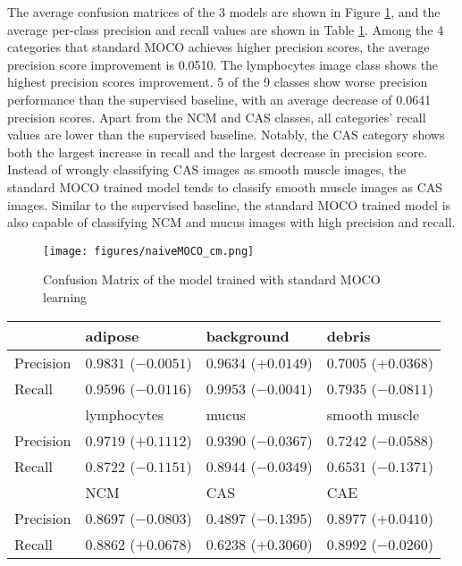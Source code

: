 \documentclass[12pt,twoside]{report}
\begin{document}
The average confusion matrices of the 3 models are shown in Figure \ref{fig:naiveMOCO_cm}, and the average per-class precision and recall values are shown in Table \ref{tab:naiveMOCO_preci_recall}. Among the 4 categories that standard MOCO achieves higher precision scores, the average precision score improvement is 0.0510. The lymphocytes image class shows the highest precision scores improvement. 5 of the 9 classes show worse precision performance than the supervised baseline, with an average decrease of 0.0641 precision scores. Apart from the NCM and CAS classes, all categories' recall values are lower than the supervised baseline. Notably, the CAS category shows both the largest increase in recall and the largest decrease in precision score. Instead of wrongly classifying CAS images as smooth muscle images, the standard MOCO trained model tends to classify smooth muscle images as CAS images. Similar to the supervised baseline, the standard MOCO trained model is also capable of classifying NCM and mucus images with high precision and recall. \\ 

\begin{figure}
    \centering
    \texttt{[image: figures/naiveMOCO\_cm.png]}
    \caption{Confusion Matrix of the model trained with standard MOCO learning}
    \label{fig:naiveMOCO_cm}
\end{figure}

\begin{table}[]
    \centering
    \begin{tabular}{llll}
\toprule
 & adipose & background & debris \\
\hline
Precision & $0.9831$ ($-0.0051$) & $0.9634$ ($+0.0149$) & $0.7005$ ($+0.0368$) \\
Recall & $0.9596$ ($-0.0116$) & $0.9953$ ($-0.0041$) & $0.7935$ ($-0.0811$) \\
\toprule
 & lymphocytes & mucus & smooth muscle \\
\hline
Precision & $0.9719$ ($+0.1112$) & $0.9390$ ($-0.0367$) & $0.7242$ ($-0.0588$) \\
Recall & $0.8722$ ($-0.1151$) & $0.8944$ ($-0.0349$) & $0.6531$ ($-0.1371$) \\
\toprule
 & NCM & CAS & CAE \\
\hline
Precision & $0.8697$ ($-0.0803$) & $0.4897$ ($-0.1395$) & $0.8977$ ($+0.0410$) \\
Recall & $0.8862$ ($+0.0678$) & $0.6238$ ($+0.3060$) & $0.8992$ ($-0.0260$) \\
    \bottomrule
    \end{tabular}
    \captionsetup{type=table}
    \label{tab:naiveMOCO_preci_recall}
\end{table}
\end{document}
